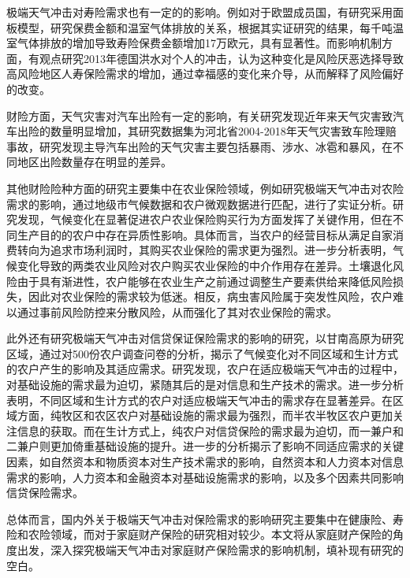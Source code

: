 极端天气冲击对寿险需求也有一定的的影响。例如对于欧盟成员国，有研究采用面板模型，研究保费金额和温室气体排放的关系\citep{melnychenko2021influence}，根据其实证研究的结果，每千吨温室气体排放的增加导致寿险保费金额增加17万欧元，具有显著性。而影响机制方面，有观点研究2013年德国洪水对个人的冲击\citep{avdeenko2021impact}，认为这种变化是风险厌恶选择导致高风险地区人寿保险需求的增加，通过幸福感的变化来介导，从而解释了风险偏好的改变。

财险方面，天气灾害对汽车出险有一定的影响，有关研究发现近年来天气灾害致汽车出险的数量明显增加\citep{张翠华2020天气灾害致车险理赔的风险分析}，其研究数据集为河北省2004-2018年天气灾害致车险理赔事故，研究发现主导汽车出险的天气灾害主要包括暴雨、涉水、冰雹和暴风，在不同地区出险数量存在明显的差异。

其他财险险种方面的研究主要集中在农业保险领域，例如研究极端天气冲击对农险需求的影响\citep{胡新艳2021气候变化}，通过地级市气候数据和农户微观数据进行匹配，进行了实证分析。研究发现，气候变化在显著促进农户农业保险购买行为方面发挥了关键作用，但在不同生产目的的农户中存在异质性影响。具体而言，当农户的经营目标从满足自家消费转向为追求市场利润时，其购买农业保险的需求更为强烈。进一步分析表明，气候变化导致的两类农业风险对农户购买农业保险的中介作用存在差异。土壤退化风险由于具有渐进性，农户能够在农业生产之前通过调整生产要素供给来降低风险损失，因此对农业保险的需求较为低迷。相反，病虫害风险属于突发性风险，农户难以通过事前风险防控来分散风险，从而强化了其对农业保险的需求。

此外还有研究极端天气冲击对信贷保证保险需求的影响的研究\citep{张钦2017高寒生态脆弱区农户对气候变化的适应需求}，以甘南高原为研究区域，通过对500份农户调查问卷的分析，揭示了气候变化对不同区域和生计方式的农户产生的影响及其适应需求。研究发现，农户在适应极端天气冲击的过程中，对基础设施的需求最为迫切，紧随其后的是对信息和生产技术的需求。进一步分析表明，不同区域和生计方式的农户对适应极端天气冲击的需求存在显著差异。在区域方面，纯牧区和农区农户对基础设施的需求最为强烈，而半农半牧区农户更加关注信息的获取。而在生计方式上，纯农户对信贷保险的需求最为迫切，而一兼户和二兼户则更加倚重基础设施的提升。进一步的分析揭示了影响不同适应需求的关键因素，如自然资本和物质资本对生产技术需求的影响，自然资本和人力资本对信息需求的影响，人力资本和金融资本对基础设施需求的影响，以及多个因素共同影响信贷保险需求。

总体而言，国内外关于极端天气冲击对保险需求的影响研究主要集中在健康险、寿险和农险领域，而对于家庭财产保险的研究相对较少。本文将从家庭财产保险的角度出发，深入探究极端天气冲击对家庭财产保险需求的影响机制，填补现有研究的空白。

